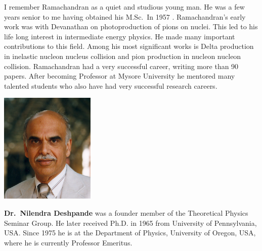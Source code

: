 I remember Ramachandran as a quiet and studious young man. He was a few years senior to me having obtained his M.Sc.\ In 1957 . Ramachandran’s early work was with Devanathan on photoproduction of pions on nuclei. This led to his life long interest in intermediate energy physics. He made many important contributions to this field. Among his most significant works is Delta production in inelastic nucleon nucleus collision and pion production in nucleon  nucleon  collision.  Ramachandran had a very successful career, writing more than 90 papers. After becoming Professor at Mysore University he mentored many talented students who also have had very successful  research careers.

\vspace{.7cm}

\centerline{\includegraphics[scale=1.6]{authorsphotos/N_G_Deshpande.eps}}  
\smallskip

\bigskip

\noindent
\textbf{Dr.\ Nilendra Deshpande} was a founder member of the Theoretical Physics Seminar Group. He later received Ph.D. in 1965 from University of Pennsylvania, USA. Since 1975 he is at the Department of Physics, University of Oregon, USA, where he is currently Professor Emeritus.
